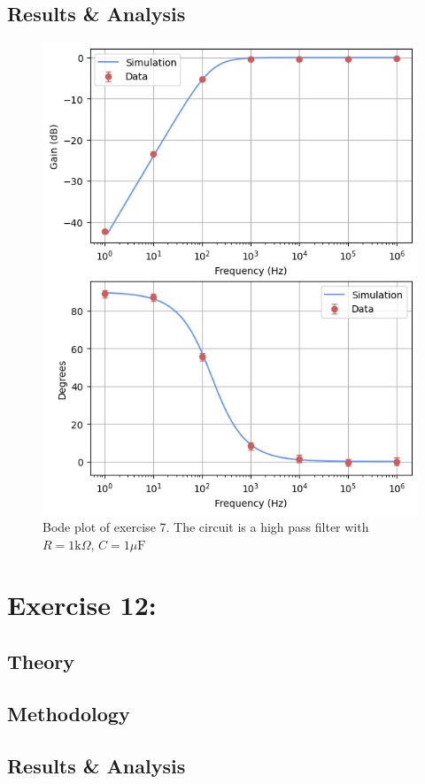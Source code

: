 \documentclass[%
reprint,
amsmath,amssymb,
aps,
floatfix
]{revtex4-2}
\begin{document}
		\subsection{Results \& Analysis}
		\begin{figure}
			\includegraphics[width=0.85\columnwidth]{ex7_dualPlot.png}
			\caption{\label{fig:ex7Results}Bode plot of exercise 7. The circuit is a high pass filter with $R = 1 \text{k}\Omega$, $C = 1 \mu\text{F}$}
		\end{figure}
		
	\section{Exercise 12: }
		\subsection{Theory}
		\subsection{Methodology}
		\subsection{Results \& Analysis}
		
\end{document}
